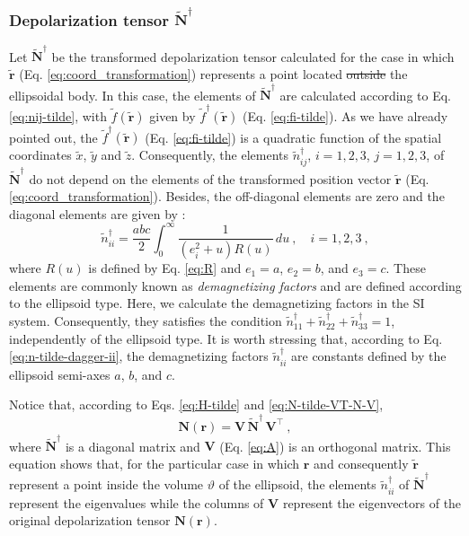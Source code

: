 \documentclass[gmd, manuscript]{copernicus}
\providecommand{\DIFadd}[1]{{\protect\color{blue}\uwave{#1}}} %
\providecommand{\DIFdel}[1]{{\protect\color{red}\sout{#1}}}                      %
\providecommand{\DIFaddbegin}{} %
\providecommand{\DIFaddend}{} %
\providecommand{\DIFdelbegin}{} %
\providecommand{\DIFdelend}{} %
\begin{document}
\subsubsection{Depolarization tensor $\tilde{\mathbf{N}}^{\dagger}$}


Let $\tilde{\mathbf{N}}^{\dagger}$ be the transformed
depolarization tensor calculated for the case in which
$\tilde{\mathbf{r}}$ (Eq. \ref{eq:coord_transformation})
represents a point located \DIFdelbegin \DIFdel{outside
}\DIFdelend \DIFaddbegin \DIFadd{inside
}\DIFaddend the ellipsoidal body. In this case,
the elements of $\tilde{\mathbf{N}}^{\dagger}$
are calculated according to Eq. \ref{eq:nij-tilde},
with $\tilde{f}(\tilde{\mathbf{r}})$ given by
$\tilde{f}^{\dagger}(\tilde{\mathbf{r}})$ (Eq. \ref{eq:fi-tilde}).
As we have already pointed out, the
$\tilde{f}^{\dagger}(\tilde{\mathbf{r}})$ (Eq. \ref{eq:fi-tilde}) is a
quadratic function of the spatial coordinates $\tilde{x}$,
$\tilde{y}$ and $\tilde{z}$. Consequently, the
elements $\tilde{n}^{\dagger}_{ij}$, $i = 1, 2, 3$,
$j = 1, 2, 3$, of $\tilde{\mathbf{N}}^{\dagger}$
do not depend on the elements of the transformed position
vector $\tilde{\mathbf{r}}$ (Eq. \ref{eq:coord_transformation}).
Besides, the off-diagonal elements are zero and
the diagonal elements are given by \citep{stoner1945}:
\begin{equation}
\tilde{n}^{\dagger}_{ii} = \frac{abc}{2}
\int_{0}^{\infty} \frac{1}{\left( e_{i}^{2}
+ u \right) R(u)} \, du \: , \quad i = 1, 2, 3 \: ,
\label{eq:n-tilde-dagger-ii}
\end{equation}
where $R(u)$ is defined by Eq. \ref{eq:R} and
$e_{1} = a$, $e_{2} = b$, and $e_{3} = c$. These elements
are commonly known as \textit{demagnetizing factors}
and are defined according to the ellipsoid type.
Here, we calculate the demagnetizing factors in the \unit{SI}
system. Consequently, they satisfies the condition
$\tilde{n}^{\dagger}_{11} + \tilde{n}^{\dagger}_{22} +
\tilde{n}^{\dagger}_{33} = 1$, independently of the
ellipsoid type.
It is worth stressing that, according to Eq. \ref{eq:n-tilde-dagger-ii},
the demagnetizing factors $\tilde{n}^{\dagger}_{ii}$ are
constants defined by the ellipsoid semi-axes $a$, $b$, and $c$.

Notice that, according to Eqs. \ref{eq:H-tilde}
and \ref{eq:N-tilde-VT-N-V},
\begin{equation}
\mathbf{N}(\mathbf{r}) =
\mathbf{V} \, \tilde{\mathbf{N}}^{\dagger} \,
\mathbf{V}^{\top} \: ,
\label{eq:N-V-N-dagger-VT}
\end{equation}
where $\tilde{\mathbf{N}}^{\dagger}$ is a diagonal
matrix and $\mathbf{V}$ (Eq. \ref{eq:A}) is an orthogonal matrix.
This equation shows that, for the particular case
in which $\mathbf{r}$ and consequently $\tilde{\mathbf{r}}$
represent a point inside the
volume $\vartheta$ of the ellipsoid, the elements
$\tilde{n}^{\dagger}_{ii}$
of $\tilde{\mathbf{N}}^{\dagger}$ represent the eigenvalues while the
columns of $\mathbf{V}$ represent the eigenvectors of the
original depolarization tensor $\mathbf{N}(\mathbf{r})$.
\end{document}
